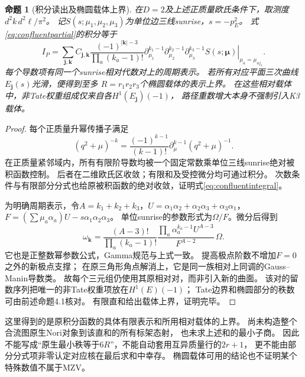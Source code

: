 \documentclass[11pt,a4paper]{ctexart}
\theoremstyle{cnplain}\newtheorem{theorem}{定理}[section]
\newtheorem{proposition}[theorem]{命题}
\theoremstyle{definition}\newtheorem{definition}[theorem]{定义}
\theoremstyle{remark}\newtheorem{remark}[theorem]{注}
\begin{document}
\begin{proposition}[积分读出及椭圆载体上界]\label{prop:confluentelliptic}
在$D=2$及上述正质量欧氏条件下，取测度$d^2k\,d^2\ell/\pi^2$。
记$S(s;\mu_1,\mu_2,\mu_3)$为单位边三线sunrise，$s=-p_E^2$。
式\eqref{eq:confluentpartial}的积分等于
\begin{equation}\label{eq:confluentintegral}
 I_P=\sum_{\boldsymbol j,\boldsymbol k}
 C_{\boldsymbol j,\boldsymbol k}
 \frac{(-1)^{|\boldsymbol k|-3}}{\prod_a(k_a-1)!}
 \left.
 \partial_{\mu_1}^{k_1-1}
 \partial_{\mu_2}^{k_2-1}
 \partial_{\mu_3}^{k_3-1}S(s;\boldsymbol\mu)
 \right|_{\mu_a=\mu_{aj_a}}.
\end{equation}
每个导数项有同一个sunrise相对代数对上的周期表示。
若所有对应平面三次曲线$E_{\boldsymbol j}(s)$光滑，便得到至多
$R=r_1r_2r_3$个椭圆载体的表示上界。
在这些相对载体中，非Tate权重组成仅来自各$H^1(E_{\boldsymbol j})(-1)$，
路径重数增大本身不强制引入K3载体。
\end{proposition}
\begin{proof}
每个正质量升幂传播子满足
\[
 (q^2+\mu)^{-k}
 =\frac{(-1)^{k-1}}{(k-1)!}\partial_\mu^{k-1}(q^2+\mu)^{-1}.
\]
在正质量紧邻域内，所有有限阶导数均被一个固定常数乘单位三线sunrise绝对被积函数控制。
后者在二维欧氏区收敛；有限和及受控微分均可通过积分。
次数条件与有限部分分式也给原被积函数的绝对收敛，证明式\eqref{eq:confluentintegral}。

为明确周期表示，令$A=k_1+k_2+k_3$，$U=\alpha_1\alpha_2+\alpha_2\alpha_3+\alpha_3\alpha_1$，
$F=(\sum\mu_a\alpha_a)U-s\alpha_1\alpha_2\alpha_3$。
单位sunrise的参数形式为$\Omega/F$。微分后得到
\begin{equation}\label{eq:confluentform}
 \omega_{\boldsymbol k}=
 \frac{(A-3)!}{\prod_a(k_a-1)!}
 \frac{\prod_a\alpha_a^{k_a-1}U^{A-3}}{F^{A-2}}\,\Omega.
\end{equation}
它也是正整数幂参数公式，Gamma规范与上式一致。
提高极点阶数不增加$F=0$之外的新极点支撑；
在原三角形角点解消上，它是同一族相对上同调的Gauss--Manin导数类。
故每个三元组仍使用其原相对对，而非引入新的曲面。
该对的留数序列把唯一的非Tate权重项放在$H^1(E)(-1)$；
Tate边界和椭圆部分的秩数可由前述命题4.1核对。
有限直和给出载体上界，证明完毕。
\end{proof}

这里得到的是原积分函数的具体有限表示和所用相对载体的上界。
尚未构造整个合流图原生Nori对象到该直和的所有标架态射，
也未求上述和的最小子商。
因此不能写成“原生最小秩等于$6R$”，不能自动套用互异质量行的$2r+1$，
更不能由部分分式项非零认定对应核在最后求和中幸存。
椭圆载体可用的结论也不证明某个特殊数值不属于MZV。
\end{document}
